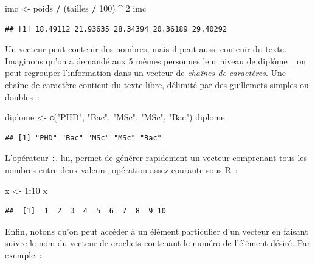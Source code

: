 \documentclass[12pt,]{book}
\newenvironment{Shaded}{\begin{snugshade}}{\end{snugshade}}
\newcommand{\DecValTok}[1]{\textcolor[rgb]{0.00,0.00,0.81}{#1}}
\newcommand{\KeywordTok}[1]{\textcolor[rgb]{0.13,0.29,0.53}{\textbf{#1}}}
\newcommand{\NormalTok}[1]{#1}
\newcommand{\OperatorTok}[1]{\textcolor[rgb]{0.81,0.36,0.00}{\textbf{#1}}}
\newcommand{\StringTok}[1]{\textcolor[rgb]{0.31,0.60,0.02}{#1}}
\begin{document}
\begin{Shaded}
\begin{Highlighting}[]
\NormalTok{imc <-}\StringTok{ }\NormalTok{poids }\OperatorTok{/}\StringTok{ }\NormalTok{(tailles }\OperatorTok{/}\StringTok{ }\DecValTok{100}\NormalTok{) }\OperatorTok{^}\StringTok{ }\DecValTok{2}
\NormalTok{imc}
\end{Highlighting}
\end{Shaded}

\begin{verbatim}
## [1] 18.49112 21.93635 28.34394 20.36189 29.40292
\end{verbatim}

Un vecteur peut contenir des nombres, mais il peut aussi contenir du texte. Imaginons qu'on a demandé aux 5 mêmes personnes leur niveau de diplôme~: on peut regrouper l'information dans un vecteur de \emph{chaînes de caractères}. Une chaîne de caractère contient du texte libre, délimité par des guillemets simples ou doubles~:

\begin{Shaded}
\begin{Highlighting}[]
\NormalTok{diplome <-}\StringTok{ }\KeywordTok{c}\NormalTok{(}\StringTok{"PHD"}\NormalTok{, }\StringTok{"Bac"}\NormalTok{, }\StringTok{"MSc"}\NormalTok{, }\StringTok{"MSc"}\NormalTok{, }\StringTok{"Bac"}\NormalTok{)}
\NormalTok{diplome}
\end{Highlighting}
\end{Shaded}

\begin{verbatim}
## [1] "PHD" "Bac" "MSc" "MSc" "Bac"
\end{verbatim}

L'opérateur \texttt{:}, lui, permet de générer rapidement un vecteur comprenant tous les nombres entre deux valeurs, opération assez courante sous R~:

\begin{Shaded}
\begin{Highlighting}[]
\NormalTok{x <-}\StringTok{ }\DecValTok{1}\OperatorTok{:}\DecValTok{10}
\NormalTok{x}
\end{Highlighting}
\end{Shaded}

\begin{verbatim}
##  [1]  1  2  3  4  5  6  7  8  9 10
\end{verbatim}

Enfin, notons qu'on peut accéder à un élément particulier d'un vecteur en faisant suivre le nom du vecteur de crochets contenant le numéro de l'élément désiré. Par exemple~:
\end{document}
